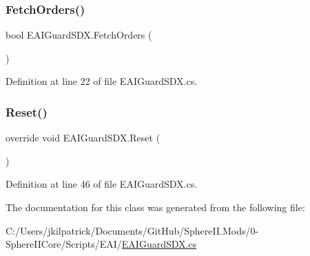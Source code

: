\subsubsection{\texorpdfstring{FetchOrders()}{FetchOrders()}}
{\footnotesize\ttfamily bool E\+A\+I\+Guard\+S\+D\+X.\+Fetch\+Orders (\begin{DoxyParamCaption}{ }\end{DoxyParamCaption})}



Definition at line 22 of file E\+A\+I\+Guard\+S\+D\+X.\+cs.

\mbox{\label{class_e_a_i_guard_s_d_x_a2f74924f511b3891410c7faaec7b852b}} 
\subsubsection{\texorpdfstring{Reset()}{Reset()}}
{\footnotesize\ttfamily override void E\+A\+I\+Guard\+S\+D\+X.\+Reset (\begin{DoxyParamCaption}{ }\end{DoxyParamCaption})}



Definition at line 46 of file E\+A\+I\+Guard\+S\+D\+X.\+cs.



The documentation for this class was generated from the following file\+:\begin{DoxyCompactItemize}
\item 
C\+:/\+Users/jkilpatrick/\+Documents/\+Git\+Hub/\+Sphere\+I\+I.\+Mods/0-\/\+Sphere\+I\+I\+Core/\+Scripts/\+E\+A\+I/\mbox{\hyperlink{_e_a_i_guard_s_d_x_8cs}{E\+A\+I\+Guard\+S\+D\+X.\+cs}}\end{DoxyCompactItemize}
